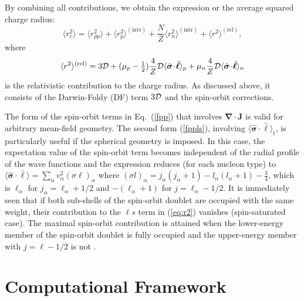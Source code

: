 \documentclass[aps,prc,twocolumn,floatfix,nofootinbib,preprintnumbers,superscriptaddress,longbibliography]{revtex4-1}
\renewcommand{\vec}{\boldsymbol}
\begin{document}
 
By combining all contributions, we obtain the expression or the average squared charge radius:
\begin{equation}\label{eq:r2}
  \langle r^2_c\rangle
  =
  \langle r^2_{pp}\rangle
  +
  \langle r^2_p\rangle^\mathrm{(intr)}
  +
  \frac{N}{Z}\langle r^2_n\rangle^\mathrm{(intr)} +   \langle r^2\rangle^\mathrm{(rel)},
  \end{equation}
 where
 \begin{equation}\label{eq:rrel}
\langle r^2\rangle^\mathrm{(rel)}=
  3{\cal D} 
  +(\mu_p-{\textstyle\frac{1}{2}})\frac{4}{Z}{\cal D}
   \langle\hat{\vec{\sigma}}\!\cdot\!\hat{\vec{\ell}}\rangle_p
  +\mu_n\frac{4}{Z}{\cal D}
   \langle\hat{\vec{\sigma}}\!\cdot\!\hat{\vec{\ell}}\rangle_n
\end{equation}
is the relativistic contribution to the charge radius. As discussed above, it consists of the Darwin-Foldy (DF) term
$3{\cal D}$ and  the spin-orbit corrections. 

 The  form of
the spin-orbit terms in Eq.~(\ref{fpp}) that involves
$\vec{\nabla}\cdot\vec{J}$ is valid for arbitrary mean-field geometry. The second form (\ref{fppls}), involving
$  \langle\hat{\vec{\sigma}}\!\cdot\!\hat{\vec{\ell}}\rangle_t$,
is particularly useful if the spherical geometry is imposed. In this case,
the expectation value of the spin-orbit term  becomes independent of the radial profile of the wave functions and the expression reduces (for each nucleon type) to 
$\langle\hat{\vec{\sigma}}\!\cdot\!\hat{\vec{\ell}}\rangle=\sum_\alpha v_\alpha^2(\sigma \ell)_\alpha$ where  $(\sigma l)_\alpha=j_\alpha(j_\alpha+1)-l_\alpha(l_\alpha+1)-\frac{3}{4}$, which is $\ell_\alpha$ for  $j_\alpha=\ell_\alpha+1/2$ and $-(\ell_\alpha+1)$ for $j=\ell_\alpha-1/2$.
It is immediately seen that if both sub-shells of the spin-orbit doublet are occupied with the same weight, their  contribution to the $\ell s$ term in (\ref{eq:r2}) vanishes (spin-saturated case). The maximal spin-orbit contribution is attained when the lower-energy member of the  spin-orbit doublet is fully occupied and the upper-energy member with $j=\ell-1/2$ is not \cite{Friar1975}. 





\section{Computational Framework}\label{sec:Framework}
\end{document}
